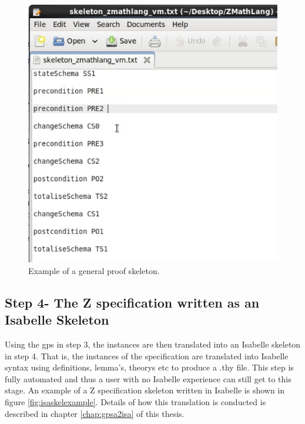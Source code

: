 \begin{figure}[H]
 \begin{center}
 \includegraphics [scale=0.2]{Figures/Design/proofskel.png}
 \caption{Example of a general proof skeleton.}
 \label{fig:proofskelexample}
\end{center}
\end{figure} 

\subsection{Step 4- The Z specification written as an Isabelle Skeleton}

Using the \gls{gps} in step 3, the instances are then translated into an Isabelle skeleton in step 4. That is, the instances of the specification are translated into Isabelle syntax using definitions, lemma's, theorys etc to produce a .thy file. This step is fully automated and thus a user with no Isabelle experience can still get to this stage. An example of a Z specification skeleton written in Isabelle is shown in figure \ref{fig:isaskelexample}. Details of how this translation is conducted is described in chapter \ref{chap:gpsa2isa} of this thesis.

